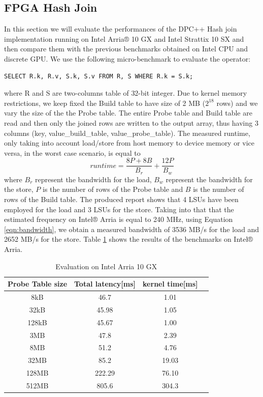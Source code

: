 \documentclass[sigconf, nonacm]{acmart}
\begin{document}
\subsection{FPGA Hash Join}
In this section we will evaluate the performances of the DPC++ Hash join implementation running on Intel Arria® 10 GX and Intel Strattix 10 SX and then compare them with the previous benchmarks obtained on Intel CPU and discrete GPU. We use the following micro-benchmark to evaluate the operator:
\begin{verbatim}
SELECT R.k, R.v, S.k, S.v FROM R, S WHERE R.k = S.k;
\end{verbatim}
where R and S are two-columns table of 32-bit integer.
Due to kernel memory restrictions, we keep fixed the Build table to have size of 2 MB ($2^{18}$ rows) and we vary the size of the the Probe table.
The entire Probe table and Build table are read and then only the joined rows are written to the output array, thus having 3 columns (key, value\_build\_table, value\_probe\_table). The measured runtime, only taking into account load/store from host memory to device memory or vice versa, in the worst case scenario, is equal to
$$runtime = \frac{8 P + 8 B}{B_r} + \frac{12 P}{B_w}$$
where $B_r$ represent the bandwidth for the load, $B_w$ represent the bandwidth for the store, $P$ is the number of rows of the Probe table and $B$ is the number of rows of the Build table.
The produced report shows that 4 LSUs have been employed for  the load and 3 LSUs for the store.
Taking into that that the estimated frequency on Intel® Arria is equal to 240 MHz, using Equation \ref{eqn:bandwidth}, we obtain a measured bandwidth of 3536 MB/s for the load and 2652 MB/s for the store.
Table \ref{tab:join-arria} shows the results of the benchmarks on Intel® Arria.
\begin{table}[H]%
  \caption{Evaluation on Intel Arria 10 GX}
  \label{tab:join-arria}
  \begin{tabular}{cccl}
    \toprule
    Probe Table size & Total latency[ms] & kernel time[ms]\\
    \midrule
    8kB & 46.7& 1.01\\
    32kB & 45.98 & 1.05\\
    128kB & 45.67 & 1.00\\
    3MB & 47.8 & 2.39\\
    8MB & 51.2 & 4.76\\
    32MB & 85.2 & 19.03\\
    128MB & 222.29 & 76.10\\
    512MB & 805.6 & 304.3\\
  \bottomrule
\end{tabular}
\end{table}
\end{document}
